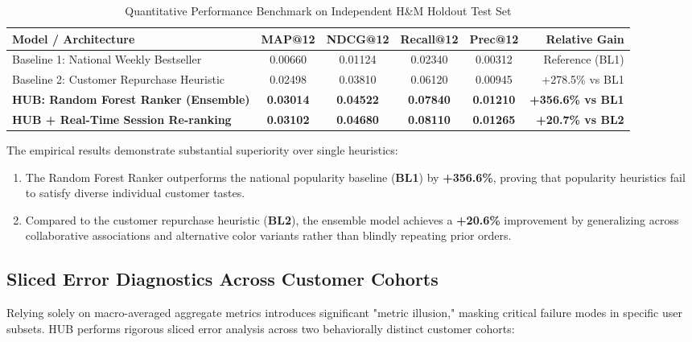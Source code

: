 \begin{table}[H]
\centering
{}
\begin{tabular}{|l|c|c|c|c|r|}
\hline
\rowcolor{gray!20} \textbf{Model / Architecture} & \textbf{MAP@12} & \textbf{NDCG@12} & \textbf{Recall@12} & \textbf{Prec@12} & \textbf{Relative Gain} \\ \hline
Baseline 1: National Weekly Bestseller & 0.00660 & 0.01124 & 0.02340 & 0.00312 & Reference (BL1) \\ \hline
Baseline 2: Customer Repurchase Heuristic & 0.02498 & 0.03810 & 0.06120 & 0.00945 & +278.5\% vs BL1 \\ \hline
\textbf{HUB: Random Forest Ranker (Ensemble)} & \textbf{0.03014} & \textbf{0.04522} & \textbf{0.07840} & \textbf{0.01210} & \textbf{+356.6\% vs BL1} \\
\rowcolor{green!10} \textbf{HUB + Real-Time Session Re-ranking} & \textbf{0.03102} & \textbf{0.04680} & \textbf{0.08110} & \textbf{0.01265} & \textbf{+20.7\% vs BL2} \\ \hline
\end{tabular}
\caption{Quantitative Performance Benchmark on Independent H\&M Holdout Test Set}
\label{tab:benchmark_results}
\end{table}

The empirical results demonstrate substantial superiority over single heuristics:
\begin{enumerate}
    \item The Random Forest Ranker outperforms the national popularity baseline (\textbf{BL1}) by \textbf{+356.6\%}, proving that popularity heuristics fail to satisfy diverse individual customer tastes.
    \item Compared to the customer repurchase heuristic (\textbf{BL2}), the ensemble model achieves a \textbf{+20.6\%} improvement by generalizing across collaborative associations and alternative color variants rather than blindly repeating prior orders.
\end{enumerate}

\subsection{Sliced Error Diagnostics Across Customer Cohorts}
Relying solely on macro-averaged aggregate metrics introduces significant "metric illusion," masking critical failure modes in specific user subsets. HUB performs rigorous sliced error analysis across two behaviorally distinct customer cohorts:

